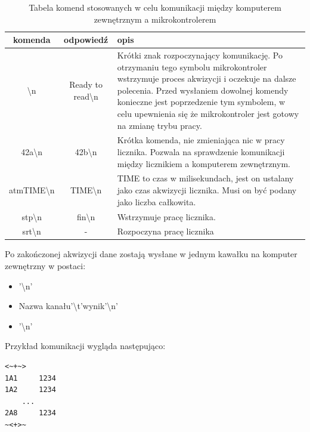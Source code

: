 \documentclass[a4paper,12pt]{article}
\begin{document}
\begin{table}
        \centering
        \caption{Tabela komend stosowanych w celu komunikacji między komputerem zewnętrznym a mikrokontrolerem}
        \label{komunikacja}
        \begin{tabularx}{\textwidth}{|c|c|X|}
                \hline
                komenda & odpowiedź & opis \\ \hline

                \textbackslash n & Ready to read\textbackslash n & 
                Krótki znak rozpoczynający komunikację.
                Po otrzymaniu tego symbolu mikrokontroler wstrzymuje proces akwizycji i oczekuje na dalsze polecenia.
                Przed wysłaniem dowolnej komendy konieczne jest poprzedzenie tym symbolem, w celu upewnienia się że mikrokontroler jest gotowy na zmianę trybu pracy.
                \\ \hline

                42a\textbackslash n & 42b\textbackslash n& Krótka komenda, nie zmieniająca nic w pracy licznika. Pozwala na sprawdzenie komunikacji między licznikiem a komputerem zewnętrznym. \\ \hline

                atm{TIME}\textbackslash n & TIME\textbackslash n& TIME to czas w milisekundach, jest on ustalany jako czas akwizycji licznika. Musi on być podany jako liczba całkowita.\\ \hline

                stp\textbackslash n& fin\textbackslash n& Wstrzymuje pracę licznika. \\ \hline

                srt\textbackslash n& - & Rozpoczyna pracę licznika \\ \hline

        \end{tabularx}
\end{table}

Po zakończonej akwizycji dane zostają wysłane w jednym kawałku na komputer zewnętrzny w postaci:
\begin{itemize}
        \item \detokenize{<~+~>}'\textbackslash n'
        \item {Nazwa kanału}'\textbackslash t'{wynik}'\textbackslash n'
        \item \detokenize{~<+>~}'\textbackslash n'
\end{itemize}
Przykład komunikacji wygląda następująco:
\begin{lstlisting}
<~+~>
1A1     1234
1A2     1234 
    ...
2A8     1234
~<+>~
\end{lstlisting}
\end{document}

